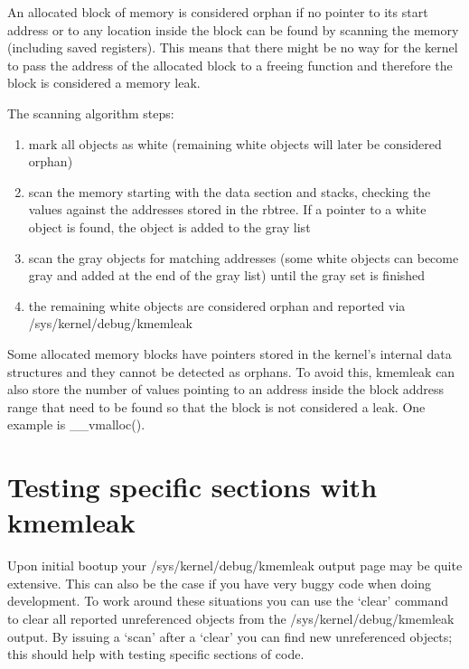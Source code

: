 \documentclass[a4paper,8pt,english]{sphinxmanual}
\begin{document}
An allocated block of memory is considered orphan if no pointer to its
start address or to any location inside the block can be found by
scanning the memory (including saved registers). This means that there
might be no way for the kernel to pass the address of the allocated
block to a freeing function and therefore the block is considered a
memory leak.

The scanning algorithm steps:
\begin{enumerate}
\item {} 
mark all objects as white (remaining white objects will later be
considered orphan)

\item {} 
scan the memory starting with the data section and stacks, checking
the values against the addresses stored in the rbtree. If
a pointer to a white object is found, the object is added to the
gray list

\item {} 
scan the gray objects for matching addresses (some white objects
can become gray and added at the end of the gray list) until the
gray set is finished

\item {} 
the remaining white objects are considered orphan and reported via
/sys/kernel/debug/kmemleak

\end{enumerate}

Some allocated memory blocks have pointers stored in the kernel's
internal data structures and they cannot be detected as orphans. To
avoid this, kmemleak can also store the number of values pointing to an
address inside the block address range that need to be found so that the
block is not considered a leak. One example is \_\_vmalloc().


\section{Testing specific sections with kmemleak}
\label{dev-tools/kmemleak:testing-specific-sections-with-kmemleak}
Upon initial bootup your /sys/kernel/debug/kmemleak output page may be
quite extensive. This can also be the case if you have very buggy code
when doing development. To work around these situations you can use the
`clear' command to clear all reported unreferenced objects from the
/sys/kernel/debug/kmemleak output. By issuing a `scan' after a `clear'
you can find new unreferenced objects; this should help with testing
specific sections of code.
\end{document}

